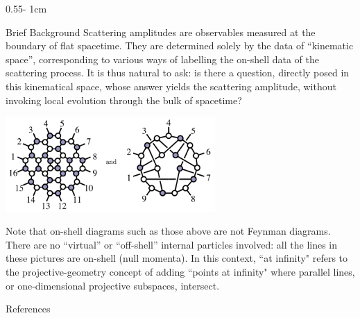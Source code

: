 \documentclass{psuposter}
\begin{document}
\begin{frame}
\begin{columns}[onlytextwidth]
\begin{column}{0.55\textwidth - 1cm}
    \begin{block}{Brief Background}
        Scattering amplitudes are observables measured at the boundary of flat spacetime. They are determined solely by the data of “kinematic space”, corresponding to various ways of labelling the on-shell data of the scattering process. It is thus natural to ask: is there a question, directly posed in this kinematical space, whose answer yields the scattering amplitude, without invoking local evolution through the bulk of spacetime? \cite{arkani-hamedCausalDiamondsCluster2020}
        \begin{center}
	    	\includegraphics[width=0.6\textwidth]{psuposter-images/on-shell}    		
    	\end{center}
		Note that on-shell diagrams such as those above are not Feynman diagrams. There are no “virtual” or “off-shell” internal particles involved: all the lines in these pictures are on-shell (null momenta).  
		In this context, ``at infinity" refers to the projective-geometry concept of adding ``points at infinity" where parallel lines, or one-dimensional projective subspaces, intersect.
        \cite{naberTopologyGeometryGauge2011b}
    \end{block}

    \begin{block}{References}
        
		
    \end{block}


\end{column}
\end{columns}
\end{frame}
\end{document}
